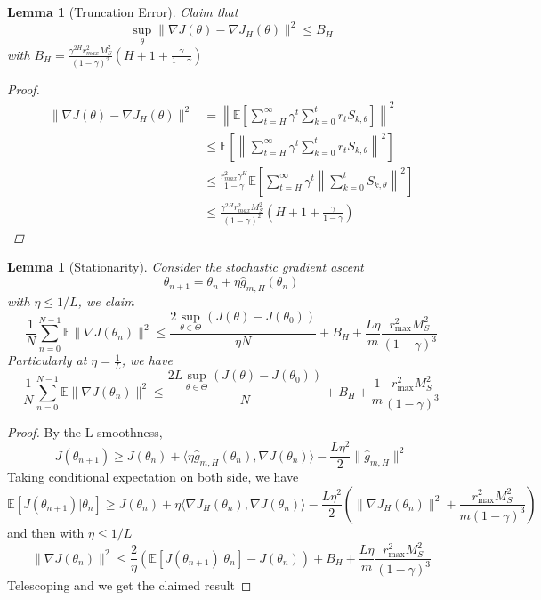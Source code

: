 \documentclass{article}
\newtheorem{lem}[thm]{Lemma}
\theoremstyle{definition}
\theoremstyle{remark}
\theoremstyle{mystyle}
\newcommand{\E}{\mathbb{E}}
\newcommand{\1}{\mathbbm{1}}
\begin{document}
\begin{lem}[Truncation Error]
Claim that
\[
\sup_\theta\|\nabla J(\theta)-\nabla J_H(\theta)\|^2\leq B_H
\]
with $B_H=\frac{\gamma^{2H}r_{max}^2 M_S^2}{(1-\gamma)^2}\left(H+1+\frac{\gamma}{1-\gamma}\right)$
\begin{proof}
    \begin{align*}
        \|\nabla J(\theta)-\nabla J_H(\theta)\|^2&=\left\|\E\left[\sum^\infty_{t=H} \gamma^t\sum^t_{k=0}r_tS_{k,\theta}\right]\right\|^2\\
        &\leq\E\left[\left\|\sum^\infty_{t=H} \gamma^t\sum^t_{k=0}r_tS_{k,\theta}\right\|^2\right]\\
        &\leq \frac{r^2_{max}\gamma^H}{1-\gamma}\E\left[\sum^\infty_{t=H} \gamma^t\left\|\sum^t_{k=0}S_{k,\theta}\right\|^2\right]\\
        &\leq \frac{\gamma^{2H}r_{max}^2 M_S^2}{(1-\gamma)^2}\left(H+1+\frac{\gamma}{1-\gamma}\right)
    \end{align*}
\end{proof}
\end{lem}
\begin{lem}[Stationarity]
    Consider the stochastic gradient ascent
    \[
    \theta_{n+1}=\theta_n+\eta \hat{g}_{m,H}(\theta_n)
    \]
    with $\eta\leq 1/L$, we claim 
    \begin{equation*}
        \frac{1}{N}\sum^{N-1}_{n=0}\E\|\nabla J(\theta_n)\|^2\leq \frac{2\sup_{\theta\in\Theta} (J(\theta)- J(\theta_0))}{\eta N}+B_H+\frac{L\eta}{m}\frac{r_{\max}^2M_S^2}
{(1-\gamma)^3}
    \end{equation*}
    Particularly at $\eta=\frac{1}{L}$, we have    
    \begin{equation*}
        \frac{1}{N}\sum^{N-1}_{n=0}\E\|\nabla J(\theta_n)\|^2\leq \frac{2L\sup_{\theta\in\Theta} (J(\theta)- J(\theta_0))}{ N}+B_H+\frac{1}{m}\frac{r_{\max}^2M_S^2}
{(1-\gamma)^3}
    \end{equation*}
    
\end{lem}
\begin{proof}
By the L-smoothness,
\begin{equation*}
    J(\theta_{n+1})\geq J(\theta_n)+\langle \eta \hat{g}_{m,H}(\theta_n),\nabla J(\theta_n)\rangle -\frac{L\eta^2}{2}\| \hat{g}_{m,H}\|^2
\end{equation*}
Taking conditional expectation on both side, we have
\begin{equation*}
    \E[J(\theta_{n+1})|\theta_n]\geq J(\theta_n)+\eta\langle  \nabla J_H(\theta_n),\nabla J(\theta_n)\rangle -\frac{L\eta^2}{2}\left(\|\nabla J_H(\theta_n)\|^2+\frac{r_{\max}^2M_S^2}
{m(1-\gamma)^3}\right)
\end{equation*}
and then with $\eta\leq 1/L$
\begin{equation*}
    \|\nabla J(\theta_n)\|^2\leq \frac{2}{\eta}(\E[J(\theta_{n+1})|\theta_n]-J(\theta_n))+B_H+\frac{L\eta}{m}\frac{r_{\max}^2M_S^2}
{(1-\gamma)^3}
\end{equation*}
Telescoping and we get the claimed result
\end{proof}
\end{document}
